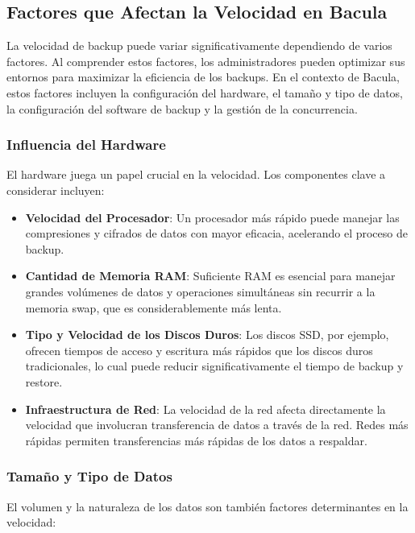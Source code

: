 \subsection{Factores que Afectan la Velocidad en Bacula}

La velocidad de backup puede variar significativamente dependiendo de varios factores. Al comprender estos factores, los administradores pueden optimizar sus entornos para maximizar la eficiencia de los backups. En el contexto de Bacula, estos factores incluyen la configuración del hardware, el tamaño y tipo de datos, la configuración del software de backup y la gestión de la concurrencia.

\subsubsection{Influencia del Hardware}

El hardware juega un papel crucial en la velocidad. Los componentes clave a considerar incluyen:

\begin{itemize}
    \item \textbf{Velocidad del Procesador}: Un procesador más rápido puede manejar las compresiones y cifrados de datos con mayor eficacia, acelerando el proceso de backup.
    \item \textbf{Cantidad de Memoria RAM}: Suficiente RAM es esencial para manejar grandes volúmenes de datos y operaciones simultáneas sin recurrir a la memoria swap, que es considerablemente más lenta.
    \item \textbf{Tipo y Velocidad de los Discos Duros}: Los discos SSD, por ejemplo, ofrecen tiempos de acceso y escritura más rápidos que los discos duros tradicionales, lo cual puede reducir significativamente el tiempo de backup y restore.
    \item \textbf{Infraestructura de Red}: La velocidad de la red afecta directamente la velocidad que involucran transferencia de datos a través de la red. Redes más rápidas permiten transferencias más rápidas de los datos a respaldar.
\end{itemize}

\subsubsection{Tamaño y Tipo de Datos}

El volumen y la naturaleza de los datos son también factores determinantes en la velocidad:

